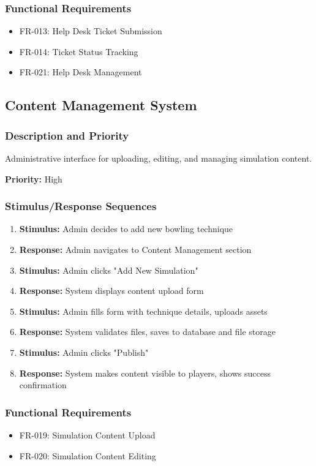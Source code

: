 \documentclass[12pt,a4paper]{article}
\begin{document}
\begin{enumerate}
\subsubsection{Functional Requirements}
\begin{itemize}
    \item FR-013: Help Desk Ticket Submission
    \item FR-014: Ticket Status Tracking
    \item FR-021: Help Desk Management
\end{itemize}

\subsection{Content Management System}

\subsubsection{Description and Priority}
Administrative interface for uploading, editing, and managing simulation content.

\textbf{Priority:} High

\subsubsection{Stimulus/Response Sequences}
\begin{enumerate}
    \item \textbf{Stimulus:} Admin decides to add new bowling technique
    \item \textbf{Response:} Admin navigates to Content Management section
    \item \textbf{Stimulus:} Admin clicks "Add New Simulation"
    \item \textbf{Response:} System displays content upload form
    \item \textbf{Stimulus:} Admin fills form with technique details, uploads assets
    \item \textbf{Response:} System validates files, saves to database and file storage
    \item \textbf{Stimulus:} Admin clicks "Publish"
    \item \textbf{Response:} System makes content visible to players, shows success confirmation
\end{enumerate}

\subsubsection{Functional Requirements}
\begin{itemize}
    \item FR-019: Simulation Content Upload
    \item FR-020: Simulation Content Editing
\end{itemize}


\end{enumerate}
\end{document}
